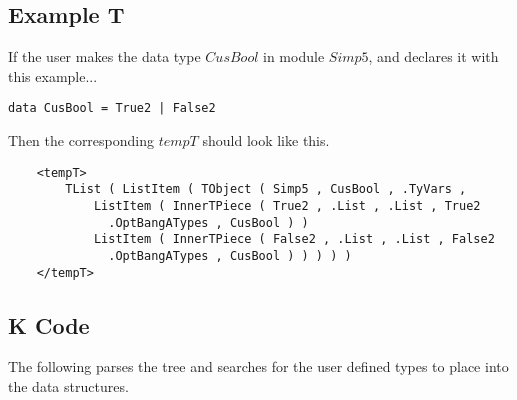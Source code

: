 \subsection{Example T}

If the user makes the data type $CusBool$ in module $Simp5$, and declares it with this example...
\begin{lstlisting}
data CusBool = True2 | False2
\end{lstlisting}

Then the corresponding $tempT$ should look like this.
\begin{lstlisting}
    <tempT>
        TList ( ListItem ( TObject ( Simp5 , CusBool , .TyVars , 
            ListItem ( InnerTPiece ( True2 , .List , .List , True2 
              .OptBangATypes , CusBool ) )
            ListItem ( InnerTPiece ( False2 , .List , .List , False2 
              .OptBangATypes , CusBool ) ) ) ) )
    </tempT>
\end{lstlisting}

\subsection{K Code}
The following parses the tree and searches for the user defined types to place into the data structures.

